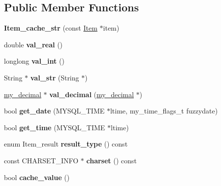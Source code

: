\subsection*{Public Member Functions}
\begin{DoxyCompactItemize}
\item 
\mbox{\label{classItem__cache__str_afa6b982f5ad5f17682ed182121b0284a}} 
{\bfseries Item\+\_\+cache\+\_\+str} (const \mbox{\hyperlink{classItem}{Item}} $\ast$item)
\item 
\mbox{\label{classItem__cache__str_a31ad5dabd261ae7bb4678ee687bf2e77}} 
double {\bfseries val\+\_\+real} ()
\item 
\mbox{\label{classItem__cache__str_af3a83947857a1d86d3a15a65968ec52e}} 
longlong {\bfseries val\+\_\+int} ()
\item 
\mbox{\label{classItem__cache__str_a9028d2b87e9501e10e2e892df9691968}} 
String $\ast$ {\bfseries val\+\_\+str} (String $\ast$)
\item 
\mbox{\label{classItem__cache__str_a101a11da4cc0f4fe5286d784b00a2291}} 
\mbox{\hyperlink{classmy__decimal}{my\+\_\+decimal}} $\ast$ {\bfseries val\+\_\+decimal} (\mbox{\hyperlink{classmy__decimal}{my\+\_\+decimal}} $\ast$)
\item 
\mbox{\label{classItem__cache__str_abb8ed9d8767230650b6ecfa3a1cc06bf}} 
bool {\bfseries get\+\_\+date} (M\+Y\+S\+Q\+L\+\_\+\+T\+I\+ME $\ast$ltime, my\+\_\+time\+\_\+flags\+\_\+t fuzzydate)
\item 
\mbox{\label{classItem__cache__str_a481126f601975faafdd41c8fbca60c5e}} 
bool {\bfseries get\+\_\+time} (M\+Y\+S\+Q\+L\+\_\+\+T\+I\+ME $\ast$ltime)
\item 
\mbox{\label{classItem__cache__str_a1fdc3a2994a9415c010418c1c59191d5}} 
enum Item\+\_\+result {\bfseries result\+\_\+type} () const
\item 
\mbox{\label{classItem__cache__str_ab50410c043eaea720d06aa70cedab933}} 
const C\+H\+A\+R\+S\+E\+T\+\_\+\+I\+N\+FO $\ast$ {\bfseries charset} () const
\item 
\mbox{\label{classItem__cache__str_a53d88acb9288bc994830726f01eb11c8}} 
bool {\bfseries cache\+\_\+value} ()
\end{DoxyCompactItemize}
